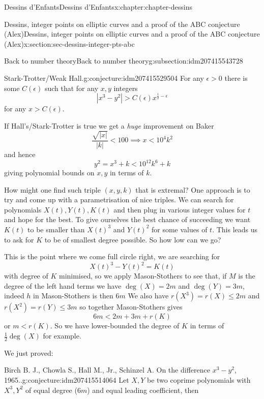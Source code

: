\documentclass[oneside,10pt,]{book}
\numberwithin{equation}{section}
\newcommand{\lt}{<}
\newcommand{\gt}{>}
\begin{document}
\begin{chapterptx}{Dessins d'Enfants}{}{Dessins d'Enfants}{}{}{x:chapter:chapter-dessins}
\begin{sectionptx}{Dessins, integer points on elliptic curves and a proof of the ABC conjecture (Alex)}{}{Dessins, integer points on elliptic curves and a proof of the ABC conjecture (Alex)}{}{}{x:section:sec-dessins-integer-pts-abc}
\begin{subsectionptx}{Back to number theory}{}{Back to number theory}{}{}{g:subsection:idm207415543728}
\begin{conjecture}{Stark-Trotter\slash{}Weak Hall.}{}{g:conjecture:idm207415529504}%
For any  \(\epsilon \gt 0\) there is some \(C(\epsilon)\) such that for any \(x,y\) integers%
\begin{equation*}
|x^3 - y^2| \gt C(\epsilon) x^{\frac12 - \epsilon}
\end{equation*}
for any \(x \gt C(\epsilon)\).%
\end{conjecture}
If Hall's\slash{}Stark-Trotter is true we get a \emph{huge} improvement on Baker%
\begin{equation*}
\frac{\sqrt{|x|}}{|k|} \lt 100 \implies x \lt 10^4k^2
\end{equation*}
and hence%
\begin{equation*}
y^2 = x^3 + k \lt 10^{12}k^6 + k
\end{equation*}
giving polynomial bounds on \(x,y\) in terms of \(k\).%
\par
How might one find such triple \((x,y,k)\) that is extremal? One approach is to try and come up with a parametrisation of nice triples. We can search for polynomials \(X(t),Y(t), K(t)\) and then plug in various integer values for \(t\) and hope for the best. To give ourselves the best chance of succeeding we want \(K(t)\) to be smaller than \(X(t)^3\) and \(Y(t)^2\) for some values of \(t\). This leads us to ask for \(K\) to be of smallest degree possible. So how low can we go?%
\par
This is the point where we come full circle right, we are searching for%
\begin{equation*}
X(t)^3 - Y(t)^2 = K(t)
\end{equation*}
with degree of \(K\) minimised, so we apply Mason-Stothers to see that, if \(M\) is the degree of the left hand terms we have \(\deg(X) = 2m\) and \(\deg (Y) = 3m\), indeed \(h\) in Mason-Stothers is then \(6m\) We also have \(r(X^3) = r(X) \le 2m\) and \(r(X^2) = r(Y) \le 3m\) so together Mason-Stothers gives%
\begin{equation*}
6m \lt 2m + 3m + r(K)
\end{equation*}
or \(m \lt r(K)\). So we have lower-bounded the degree of \(K\) in terms of \(\frac 12 \deg(X)\) for example.%
\par
We just proved:%
\begin{conjecture}{Birch B. J., Chowla S., Hall M., Jr., Schinzel A. On the difference \(x^3 - y^2\), 1965..}{}{g:conjecture:idm207415514064}%
Let \(X, Y\) be two coprime polynomials with \(X^3,Y^2\) of equal degree (\(6m\)) and equal leading coefficient, then%

\end{conjecture}
\end{subsectionptx}
\end{sectionptx}
\end{chapterptx}
\end{document}
